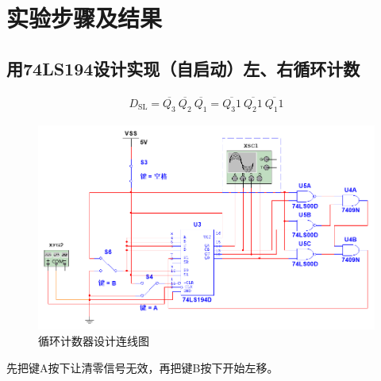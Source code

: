 \documentclass{ctexrep}
\begin{document}
\section{实验步骤及结果}%
\label{sec:实验步骤及结果\arabic{chapter}}

\subsection{用74LS194设计实现（自启动）左、右循环计数}%
\label{sub:用74LS194设计实现（自启动）左、右循环计数}

\begin{align}
	D_\mathrm{SL}=\overline{Q_3}~\overline{Q_2}~\overline{Q_1}= \overline{Q_3 1}~\overline{Q_2 1}~\overline{Q_1 1}
\end{align}

\begin{figure}[htpb]
	\centering
	\includegraphics[width=\linewidth]{421.png}
	\caption{循环计数器设计连线图}
	\label{fig:循环计数器设计连线图}
\end{figure}

先把键A按下让清零信号无效，再把键B按下开始左移。
\end{document}
